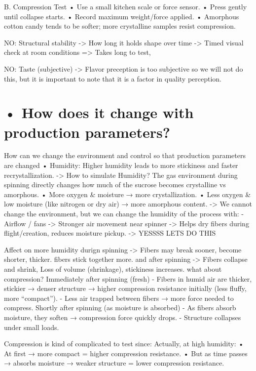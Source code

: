  B. Compression Test
	•	Use a small kitchen scale or force sensor.
	•	Press gently until collapse starts.
	•	Record maximum weight/force applied.
	•	Amorphous cotton candy tends to be softer; more crystalline samples resist compression.

NO: Structural stability -> How long it holds shape over time -> Timed visual check at room conditions => Takes long to test, 

NO: Taste (subjective) -> Flavor preception is too subjective so we will not do this, but it is important to note that it is a factor in quality perception.

\section{    •	How does it change with production parameters?}
How can we change the environment and control so that production parameters are changed 
    •	Humidity: Higher humidity leads to more stickiness and faster recrystallization. -> How to simulate Humidity?
    The gas environment during spinning directly changes how much of the sucrose becomes crystalline vs amorphous.
	•	More oxygen \& moisture → more crystallization.
	•	Less oxygen \& low moisture (like nitrogen or dry air) → more amorphous content.
    -> We cannot change the environment, but we can change the humidity of the process with:
        - Airflow / fans -> Stronger air movement near spinner -> Helps dry fibers during flight/creation, reduces moisture pickup.
    -> YESSSS LETS DO THIS

    Affect on more humidity durign spinning -> Fibers may break sooner, become shorter, thicker. fibers stick together more.
    and after spinning -> Fibers collapse and shrink, Loss of volume (shrinkage), stickiness increases. what about compression?
    Immediately after spinning (fresh)
- Fibers in humid air are thicker, stickier → denser structure → higher compression resistance initially (less fluffy, more “compact”). - Less air trapped between fibers → more force needed to compress.
Shortly after spinning (as moisture is absorbed)
- As fibers absorb moisture, they soften → compression force quickly drops. - Structure collapses under small loads.

Compression is kind of complicated to test since: 
Actually, at high humidity:
	•	At first → more compact = higher compression resistance.
	•	But as time passes → absorbs moisture → weaker structure = lower compression resistance.

